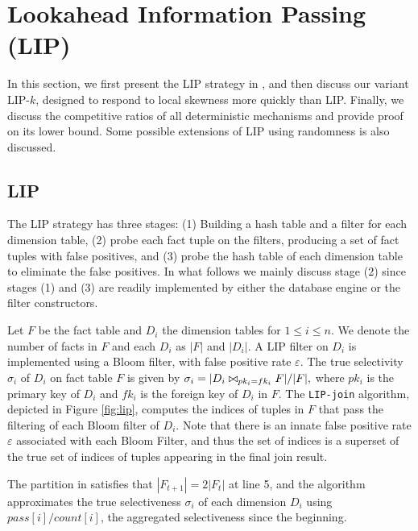 
\section{Lookahead Information Passing (LIP)}
In this section, we first present the LIP strategy in \cite{zhu2017looking}, and then discuss our variant LIP-$k$, designed to respond to local skewness more quickly than LIP. Finally, we discuss the competitive ratios of all deterministic mechanisms and provide proof on its lower bound. Some possible extensions of LIP using randomness is also discussed.



\subsection{LIP}
The LIP strategy has three stages: (1) Building a hash table and a filter for each dimension table, (2) probe each fact tuple on the filters, producing a set of fact tuples with false positives, and (3) probe the hash table of each dimension table to eliminate the false positives. In what follows we mainly discuss stage (2) since stages (1) and (3) are readily implemented by either the database engine or the filter constructors.

Let $F$ be the fact table and $D_i$ the dimension tables for $1 \leq i \leq n$. We denote the number of facts in $F$ and each $D_i$ as $|F|$ and $|D_i|$. A LIP filter on $D_i$ is implemented using a Bloom filter, with false positive rate $\varepsilon$. The true selectivity $\sigma_i$ of $D_i$ on fact table $F$ is given by $\sigma_i = |D_i \bowtie_{pk_i = fk_i} F| / |F|,$ where $pk_i$ is the primary key of $D_i$ and $fk_i$ is the foreign key of $D_i$ in $F$. The \texttt{LIP-join} algorithm, depicted in Figure \ref{fig:lip}, computes the indices of tuples in $F$ that pass the filtering of each Bloom filter of $D_i$. Note that there is an innate false positive rate $\varepsilon$ associated with each Bloom Filter, and thus the set of indices is a superset of the true set of indices of tuples appearing in the final join result.

The partition in \cite{zhu2017looking} satisfies that $|F_{t+1}| = 2|F_{t}|$ at line 5, and the algorithm approximates the true selectiveness $\sigma_i$ of each dimension $D_i$ using $pass[i]/count[i]$, the aggregated selectiveness since the beginning.


